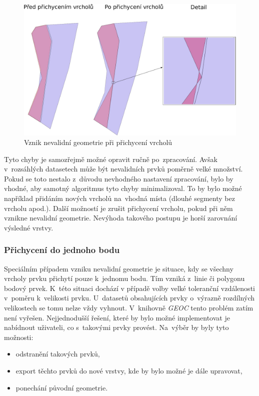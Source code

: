 \label{vsinvalid}
  \begin{figure}[hbt]
    \centering
      \includegraphics[width=350pt]{./pictures/vs-invalid.pdf}
      \caption{Vznik nevalidní geometrie při přichycení vrcholů}
      \label{fig:vs-nevalidni}
  \end{figure} 

Tyto chyby je samozřejmě možné opravit ručně po~zpracování. Avšak
v~rozsáhlých datasetech může být nevalidních prvků poměrně velké množství.
Pokud se toto nestalo z~důvodu nevhodného nastavení zpracování, bylo by 
vhodné, aby samotný algoritmus tyto chyby minimalizoval. To by bylo možné 
například přidáním nových vrcholů na~vhodná místa (dlouhé segmenty bez vrcholu
apod.). Další možností je zrušit přichycení vrcholu, pokud při něm vznikne
nevalidní geometrie. Nevýhoda takového postupu je horší zarovnání výsledné 
vrstvy. 

\subsubsection{Přichycení do jednoho bodu}
Speciálním případem vzniku nevalidní geometrie je situace, kdy se všechny 
vrcholy prvku přichytí pouze k~jednomu bodu. Tím vzniká z~linie či polygonu
bodový prvek. K~této situaci dochází v případě volby velké toleranční 
vzdálenosti v~poměru k~velikosti prvku. U~datasetů obsahujících prvky
o~výrazně rozdílných velikostech se tomu nelze vždy vyhnout. V~knihovně
\textit{GEOC} tento problém zatím není vyřešen. Nejjednodušší řešení, které
by bylo možné implementovat je nabídnout uživateli, co s~takovými prvky provést.
Na~výběr by byly tyto možnosti:
\begin{itemize}
 \item odstranění takových prvků,
 \item export těchto prvků do nové vrstvy, kde by bylo možné je dále upravovat,
 \item ponechání původní geometrie. 
\end{itemize}


